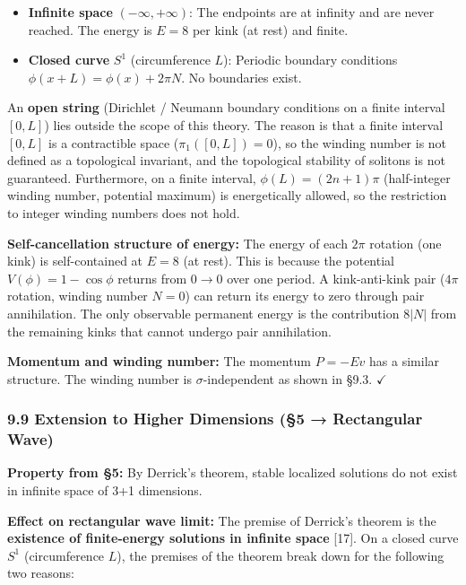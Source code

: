 \documentclass[a4paper,11pt]{article}
\providecommand{\tightlist}{\setlength{\itemsep}{0pt}\setlength{\parskip}{0pt}}
\begin{document}
\begin{itemize}
\tightlist
\item
  \textbf{Infinite space} \((-\infty, +\infty)\): The endpoints are at
  infinity and are never reached. The energy is \(E = 8\) per kink (at
  rest) and finite.
\item
  \textbf{Closed curve} \(S^1\) (circumference \(L\)): Periodic boundary
  conditions \(\phi(x+L) = \phi(x) + 2\pi N\). No boundaries exist.
\end{itemize}

An \textbf{open string} (Dirichlet / Neumann boundary conditions on a
finite interval \([0, L]\)) lies outside the scope of this theory. The
reason is that a finite interval \([0, L]\) is a contractible space
(\(\pi_1([0,L]) = 0\)), so the winding number is not defined as a
topological invariant, and the topological stability of solitons is not
guaranteed. Furthermore, on a finite interval, \(\phi(L) = (2n+1)\pi\)
(half-integer winding number, potential maximum) is energetically
allowed, so the restriction to integer winding numbers does not hold.

\textbf{Self-cancellation structure of energy:} The energy of each
\(2\pi\) rotation (one kink) is self-contained at \(E = 8\) (at rest).
This is because the potential \(V(\phi) = 1-\cos\phi\) returns from
\(0 \to 0\) over one period. A kink-anti-kink pair (\(4\pi\) rotation,
winding number \(N = 0\)) can return its energy to zero through pair
annihilation. The only observable permanent energy is the contribution
\(8|N|\) from the remaining kinks that cannot undergo pair annihilation.

\textbf{Momentum and winding number:} The momentum \(P = -Ev\) has a
similar structure. The winding number is \(\sigma\)-independent as shown
in §9.3. \(\checkmark\)

\subsubsection{9.9 Extension to Higher Dimensions (§5 → Rectangular
Wave)}\label{extension-to-higher-dimensions-5-rectangular-wave}

\textbf{Property from §5:} By Derrick's theorem, stable localized
solutions do not exist in infinite space of 3+1 dimensions.

\textbf{Effect on rectangular wave limit:} The premise of Derrick's
theorem is the \textbf{existence of finite-energy solutions in infinite
space} {[}17{]}. On a closed curve \(S^1\) (circumference \(L\)), the
premises of the theorem break down for the following two reasons:
\end{document}
